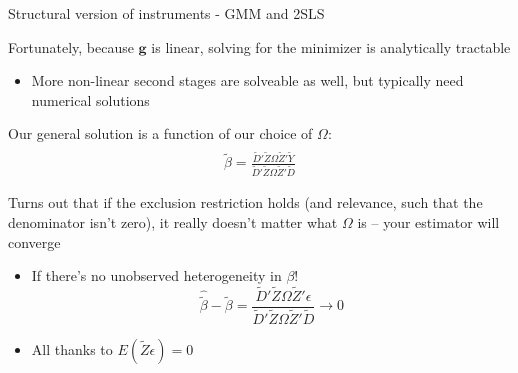 \documentclass[notes,11pt, aspectratio=169]{beamer}
\newenvironment{wideitemize}{\itemize\addtolength{\itemsep}{10pt}}{\enditemize}
\begin{document}
\begin{frame}{Structural version of instruments - GMM and 2SLS}
  \begin{wideitemize}
  \item Fortunately, because $\mathbf{g}$ is linear, solving for the minimizer is analytically tractable
    \begin{itemize}
    \item More non-linear second stages are solveable as well, but typically need numerical solutions
    \end{itemize}
  \item Our general solution is a function of our choice of $\Omega$:
    \begin{align*}
      \hat{\widetilde{\beta}} = \frac{\widetilde{D}'\widetilde{Z} \Omega \widetilde{Z}'\widetilde{Y}}{\widetilde{D}'\widetilde{Z} \Omega \widetilde{Z}'\widetilde{D}}
    \end{align*}
  \item Turns out that if the exclusion restriction holds (and
    relevance, such that the denominator isn't zero), it really
    doesn't matter what $\Omega$ is -- your estimator will converge
    \begin{itemize}
    \item If there's no unobserved heterogeneity in $\beta$!
    \begin{equation*}
      \hat{\widetilde{\beta}} -\widetilde{\beta} = \frac{\widetilde{D}'\widetilde{Z} \Omega \widetilde{Z}'\epsilon}{\widetilde{D}'\widetilde{Z} \Omega \widetilde{Z}'\widetilde{D}} \rightarrow 0
    \end{equation*}
    \item All thanks to $E(\widetilde{Z}\epsilon) = 0$
    \end{itemize}
  \end{wideitemize}
\end{frame}
\end{document}
